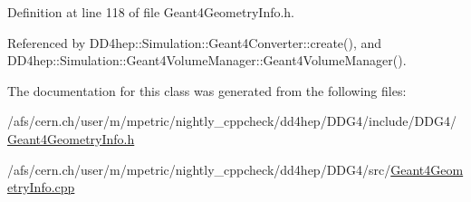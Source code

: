 Definition at line 118 of file Geant4\+Geometry\+Info.\+h.



Referenced by D\+D4hep\+::\+Simulation\+::\+Geant4\+Converter\+::create(), and D\+D4hep\+::\+Simulation\+::\+Geant4\+Volume\+Manager\+::\+Geant4\+Volume\+Manager().



The documentation for this class was generated from the following files\+:\begin{DoxyCompactItemize}
\item 
/afs/cern.\+ch/user/m/mpetric/nightly\+\_\+cppcheck/dd4hep/\+D\+D\+G4/include/\+D\+D\+G4/\hyperlink{_geant4_geometry_info_8h}{Geant4\+Geometry\+Info.\+h}\item 
/afs/cern.\+ch/user/m/mpetric/nightly\+\_\+cppcheck/dd4hep/\+D\+D\+G4/src/\hyperlink{_geant4_geometry_info_8cpp}{Geant4\+Geometry\+Info.\+cpp}\end{DoxyCompactItemize}
